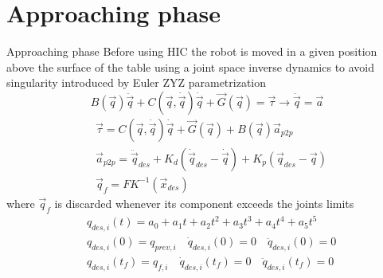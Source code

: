 \section{Approaching phase}
\begin{frame}[shrink=10]{Approaching phase}
  Before using HIC the robot is moved in a given position above the surface of the table using a joint space inverse dynamics
  \alert{to avoid singularity} introduced by Euler ZYZ parametrization
  \[
  B(\vec{q}) \ddot{\vec{q}} + C(\vec{q}, \dot{\vec{q}}) \dot{\vec{q}} + \vec{G}(\vec{q}) = \vec{\tau}
  \longrightarrow \ddot{\vec{q}} = \vec{a}
  \]
  \[
  \begin{split}
    &\vec{\tau} = C(\vec{q}, \dot{\vec{q}}) \dot{\vec{q}} + \vec{G}(\vec{q})  +  B(\vec{q}) \vec{a}_{p2p}\\
    &\vec{a}_{p2p} = \ddot{\vec{q}}_{des} + K_d(\dot{\vec{q}}_{des} - \dot{\vec{q}}) + K_p(\vec{q}_{des} - \vec{q})\\
    &\vec{q}_{f} = FK^{-1}(\vec{x}_{des})
  \end{split}
  \]
  where $\vec{q}_f$ is \alert{discarded whenever its component exceeds the joints limits}
  \[
  \begin{split}
    &q_{des, i}(t) = a_0 + a_1 t + a_2 t^2 + a_3 t^3 + a_4 t^4 + a_5 t^5\\
    &q_{des, i}(0) = q_{prev,i} \quad \dot{q}_{des, i}(0) = 0 \quad \ddot{q}_{des, i}(0) = 0\\
    &q_{des, i}(t_f) = q_{f,i} \quad \dot{q}_{des, i}(t_f) = 0 \quad \ddot{q}_{des, i}(t_f) = 0
  \end{split}
  \]
\end{frame}
